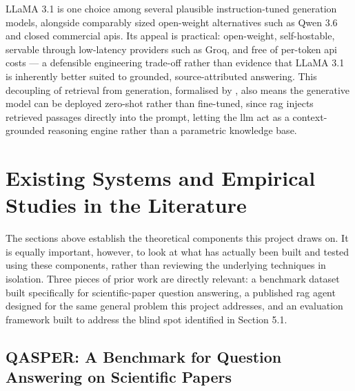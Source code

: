 \newline \newline LLaMA 3.1 is one choice among several plausible instruction-tuned generation models, alongside comparably sized open-weight alternatives such as Qwen 3.6 and closed commercial \gls{api}s. Its appeal is practical: open-weight, self-hostable, servable through low-latency providers such as Groq, and free of per-token \gls{api} costs — a defensible engineering trade-off rather than evidence that LLaMA 3.1 is inherently better suited to grounded, source-attributed answering. This decoupling of retrieval from generation, formalised by \citet{lewis2020retrieval}, also means the generative model can be deployed zero-shot rather than fine-tuned, since \gls{rag} injects retrieved passages directly into the prompt, letting the \gls{llm} act as a context-grounded reasoning engine rather than a parametric knowledge base.

\section{Existing Systems and Empirical Studies in the Literature}

The sections above establish the theoretical components this project draws on. It is equally important, however, to look at what has actually been built and tested using these components, rather than reviewing the underlying techniques in isolation. Three pieces of prior work are directly relevant: a benchmark dataset built specifically for scientific-paper question answering, a published \gls{rag} agent designed for the same general problem this project addresses, and an evaluation framework built to address the blind spot identified in Section 5.1.

\subsection{QASPER: A Benchmark for Question Answering on Scientific Papers}

